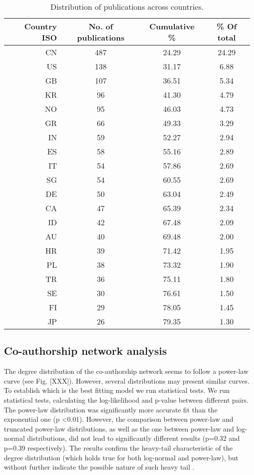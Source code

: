 \documentclass[a4paper, review, endfloat, authoryear]{elsarticle}
\begin{document}
	\begin{table}[h]
		\centering
		\caption{Distribution of publications across countries.}
		\begin{tabular}{r c c c}
			\hline
			Country ISO & No. of publications & Cumulative \% & \% Of total \\
			\hline
			CN & 487 & 24.29 & 24.29\\
			US & 138 & 31.17 & 6.88\\
			GB & 107 & 36.51 & 5.34\\
			KR & 96 & 41.30 & 4.79\\
			NO & 95 & 46.03 & 4.73\\
			GR & 66 & 49.33 & 3.29\\
			IN & 59 & 52.27 & 2.94\\
			ES & 58 & 55.16 & 2.89\\
			IT & 54 & 57.86 & 2.69\\
			SG & 54 & 60.55 & 2.69\\
			DE & 50 & 63.04 & 2.49\\
			CA & 47 & 65.39 & 2.34\\
			ID & 42 & 67.48 & 2.09\\
			AU & 40 & 69.48 & 2.00\\
			HR & 39 & 71.42 & 1.95\\
			PL & 38 & 73.32 & 1.90\\
			TR & 36 & 75.11 & 1.80\\
			SE & 30 & 76.61 & 1.50\\
			FI & 29 & 78.05 & 1.45\\
			JP & 26 & 79.35 & 1.30\\
			\hline
		\end{tabular}
		\label{tab:resdesccountry}
	\end{table}

	\subsection{Co-authorship network analysis}
	The degree distribution of the co-authorship network seems to follow a power-law curve (see Fig. [XXX]). However, several distributions may present similar curves. To establish which is the best fitting model we run statistical tests. We run statistical tests, calculating the log-likelihood and p-value between different pairs. The power-law distribution was significantly more accurate fit than the exponential one (p \textless 0.01). However, the comparison between power-law and truncated power-law distributions, as well as the one between power-law and log-normal distributions, did not lead to significantly different results (p=0.32 and p=0.39 respectively). The results confirm the heavy-tail characteristic of the degree distribution (which holds true for both log-normal and power-law), but without further indicate the possible nature of such heavy tail \citep{mitzenmacher2004brief,higaki2020co,liu2021structural,smith2021explaining}.
	
\end{document}
